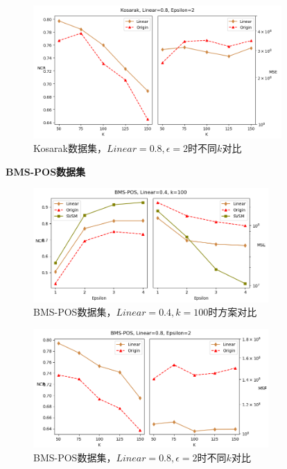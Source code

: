 \documentclass[UTF8,a4paper]{ctexart}
\begin{document}
  \begin{figure}[htbp]
    \centering
    \includegraphics[width=0.845\textwidth]{kosarak_self}
    \caption{Kosarak数据集，$Linear=0.8,\epsilon=2$时不同$k$对比}
    \label{fig:kosarak_self}
  \end{figure}

\newpage
\textbf{BMS-POS数据集}

  \begin{figure}[htbp]
    \centering
    \includegraphics[width=0.8\textwidth]{pos_compare}
    \caption{BMS-POS数据集，$Linear=0.4,k=100$时方案对比}
    \label{fig:pos_compare}
  \end{figure}

  \begin{figure}[htbp]
    \centering
    \includegraphics[width=0.8\textwidth]{pos_self}
    \caption{BMS-POS数据集，$Linear=0.8,\epsilon=2$时不同$k$对比}
    \label{fig:pos_self}
  \end{figure}
\end{document}
